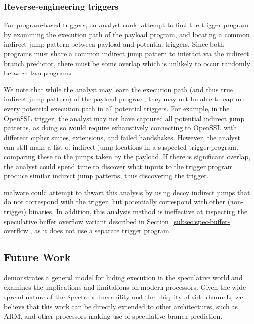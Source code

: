 \subsubsection{Reverse-engineering triggers}
For program-based triggers, an analyst could attempt to find the trigger program
by examining the execution path of the payload program, and locating a common
indirect jump pattern between payload and potential triggers. Since both programs must
share a common indirect jump pattern to interact via the indirect branch
predictor, there must be some overlap which is unlikely to occur randomly
between two programs.

We note that while the analyst may learn the execution path (and thus true
indirect jump pattern) of the payload program, they may not be able to capture
every potential execution path in all potential triggers. For example, in the
OpenSSL trigger, the analyst may not have captured all potential indirect jump
patterns, as doing so would require exhaustively connecting to OpenSSL with
different cipher suites, extensions, and failed handshakes. However, the analyst
can still make a list of indirect jump locations in a suspected trigger program,
comparing these to the jumps taken by the payload. If there is significant
overlap, the analyst could spend time to discover what inputs to the trigger
program produce similar indirect jump patterns, thus discovering the trigger.

\speculake malware could attempt to thwart this analysis by using decoy indirect
jumps that do not correspond with the trigger, but potentially correspond with
other (non-trigger) binaries. In addition, this analysis method is ineffective
at inspecting the speculative buffer overflow variant described in
Section~\ref{subsec:spec-buffer-overflow}, as it does not use a separate trigger
program.

\subsection{Future Work}
\label{subsec:future-work}

\speculake demonstrates a general model for hiding execution in 
the speculative world and examines the implications and limitations on
modern processors. Given the wide-spread nature of the Spectre vulnerability 
and the ubiquity of side-channels, we believe that this work can 
be directly extended to other architectures, such as ARM, and other processors
making use of
speculative branch prediction.

